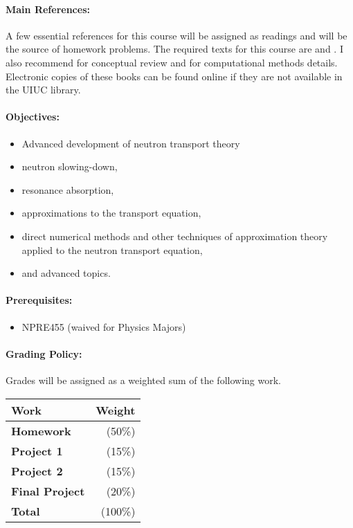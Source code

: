 \documentclass[11pt, a4paper]{article}
\begin{document}
\paragraph{Main References:}
A few essential references for this course will be assigned as readings and 
will be the source of homework problems. The required texts for this course are 
\cite{stacey_nuclear_2007} and \cite{bell_nuclear_1970}. I also recommend 
\cite{duderstadt_transport_1979} for conceptual review and 
\cite{lewis_computational_1993} for computational methods details.
Electronic copies of these books can be found online if they are not available
in the UIUC library.


\renewcommand{\refname}{\normalfont\selectfont\normalsize}\vspace{-1cm}


\paragraph{Objectives:}
\begin{itemize}
\item Advanced development of neutron transport theory
\item  neutron slowing-down,
\item resonance absorption,
\item  approximations to the transport equation,
\item  direct numerical methods and other techniques of approximation theory 
        applied to the neutron transport equation,
\item  and advanced topics. 
\end{itemize}

\paragraph{Prerequisites:}
\begin{itemize}
\item NPRE455 (waived for Physics Majors) 
\end{itemize}

\paragraph{Grading Policy:} Grades will be assigned as a weighted sum of the
following work.

\begin{table}[h]
\begin{tabularx}{\textwidth}{Xr}
        \textbf{Work} & \textbf{Weight} \\
\hline
\textbf{Homework}    & (50\%)  \\
\textbf{Project 1}    & (15\%)  \\
\textbf{Project 2}    & (15\%)  \\
\textbf{Final Project}  & (20\%)  \\
\hline
\textbf{Total}       & (100\%)\\
\end{tabularx}
\end{table}
\end{document}
